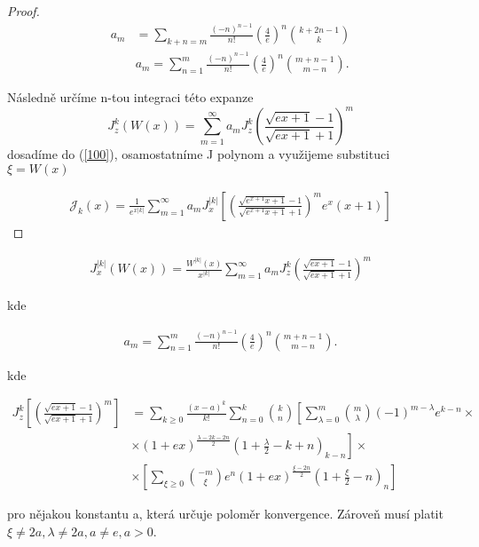 \begin{proof}
        \begin{align*}
                a_m &= \sum_{k+n=m}\frac{(-n)^{n-1}}{n!} \left( 
                \frac{4}{e}\right)^n \binom{k+2n-1}{k} \\ & a_m =
                \sum_{n=1}^{m}\frac{(-n)^{n-1}}{n!}\left( 
                \frac{4}{e}\right)^n \binom{m+n-1}{m-n}.  
        \end{align*}
        
        Následně určíme n-tou integraci této expanze
        \[  J_z^k(W(x)) = \sum_{m=1}^\infty a_m  J_z^k 
        \left( \frac{\sqrt{ex+1}-1}{\sqrt{ex + 1} +1}\right)^m\]
        dosadíme do (\ref{100}), osamostatníme J polynom 
        a využijeme substituci \(\xi = W(x)\)
        
        \begin{align}
                \mathcal{J}_k(x) = \frac{1}{e^{x|k|}}\sum_{m=1}^\infty 
                a_m J_x^{|k|}\left[ \left( \frac{\sqrt{e^{x+1}x+1}-1}{
                \sqrt{e^{x+1}x + 1} +1}\right)^m e^x (x+1)\right]
        \end{align}
\end{proof}

\begin{align}
        J^{|k|}_x(W(x)) =  \frac{W^{|k|}(x)}{x^{|k|}}\sum_{m=1}^\infty
        a_m  J_z^k \left( \frac{\sqrt{ex+1}-1}{\sqrt{ex + 1} +1}\right)^m
\label{100}
\end{align}

kde

\begin{align}
        a_m = \sum_{n=1}^{m}\frac{(-n)^{n-1}}{n!}\left( 
        \frac{4}{e}\right)^n \binom{m+n-1}{m-n}.
\end{align}

kde

\begin{align}
        J_z^k \left[\left( \frac{\sqrt{ex+1}-1}{\sqrt{ex + 1}
        +1}\right)^m\right] &= \sum_{k \geq 0}\frac{(x-a)^k}{k!}
        \sum_{n=0}^k \binom{k}{n}\left[ \sum_{\lambda =0}^m \binom{m}{
        \lambda}(-1)^{m-\lambda}e^{k-n}\times\right. \\ &\left.\times(
        1+ex)^{\frac{\lambda-2k-2n}{2}}\left( 1+\frac{\lambda}{2}-k+n
        \right)_{k-n}\right] \times \\
        & \times
        \left[ \sum_{\xi \geq 0} \binom{-m}{\xi} e^n(1+ex)^{
        \frac{\xi-2n}{2}}\left( 1+\frac{\xi}{2}-n\right)_n\right]
\end{align}

pro nějakou konstantu a, která určuje poloměr konvergence.
Zároveň musí platit \(\xi \neq 2a, \lambda \neq 2a, a \neq 
e, a>0\).
